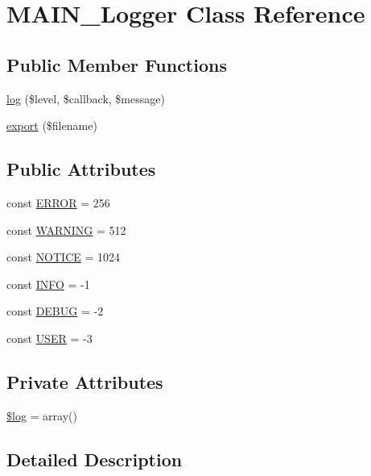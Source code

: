 \hypertarget{classMAIN__Logger}{
\section{MAIN\_\-Logger Class Reference}
\label{d3/dff/classMAIN__Logger}
}
\subsection*{Public Member Functions}
\begin{DoxyCompactItemize}
\item 
\hyperlink{classMAIN__Logger_a06d6ccbf1df65ec1bbdc88d88453fbd2}{log} (\$level, \$callback, \$message)
\item 
\hyperlink{classMAIN__Logger_aeb44a3f5e4ce98ab2380743b28c9ac44}{export} (\$filename)
\end{DoxyCompactItemize}
\subsection*{Public Attributes}
\begin{DoxyCompactItemize}
\item 
const \hyperlink{classMAIN__Logger_a2af8dfdb8d9e1b23122783c5d85e2da0}{ERROR} = 256
\item 
const \hyperlink{classMAIN__Logger_a9d79bb27ec1dfe5b64f8a78f2f6ceb9b}{WARNING} = 512
\item 
const \hyperlink{classMAIN__Logger_a104a24882667b4b8f4452abb03c8266c}{NOTICE} = 1024
\item 
const \hyperlink{classMAIN__Logger_a7583fcdf96a9dba7c0ec52637e1d11d7}{INFO} = -\/1
\item 
const \hyperlink{classMAIN__Logger_ac7a1e837542ce1762a63d2713060c4ae}{DEBUG} = -\/2
\item 
const \hyperlink{classMAIN__Logger_a75824ecd65029652b81460f69b83b779}{USER} = -\/3
\end{DoxyCompactItemize}
\subsection*{Private Attributes}
\begin{DoxyCompactItemize}
\item 
\hyperlink{classMAIN__Logger_afa86bba01c2165e0cb2aaa9faaae372b}{\$log} = array()
\end{DoxyCompactItemize}


\subsection{Detailed Description}


